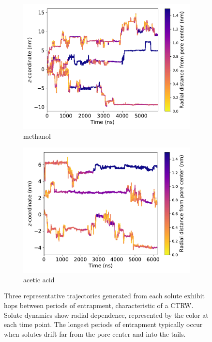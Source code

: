 \documentclass[aps,pre,preprint,groupedaddress,longbibliography]{revtex4-2}
\begin{document}
\begin{figure}
\begin{subfigure}{0.45\textwidth}
  \includegraphics[width=\textwidth]{MET_trajectories.pdf}
  \caption{methanol}\label{fig:MET_trajectories}
  \end{subfigure}
  \begin{subfigure}{0.45\textwidth}
  \includegraphics[width=\textwidth]{ACH_trajectories.pdf}
  \caption{acetic acid}\label{fig:ACH_trajectories}
  \end{subfigure}
  \caption{Three representative trajectories generated from each solute exhibit hops
	  between periods of entrapment, characteristic of a CTRW. Solute
	  dynamics show radial dependence, represented by the color at each
	  time point. The longest periods of entrapment typically occur when
	  solutes drift far from the pore center and into the tails.
  }\label{fig:solute_trajectories}
  \end{figure}
  
\end{document}
